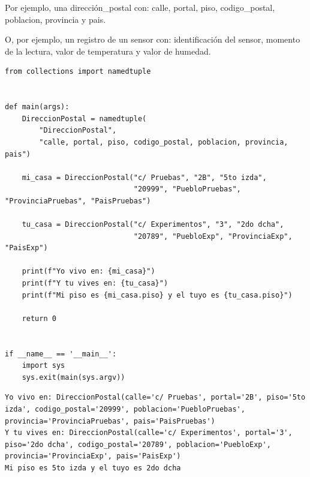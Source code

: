 \documentclass[spanish,12pt,a4paper,final,oneside]{book}
\begin{document}
Por ejemplo, una dirección\_postal con: calle, portal, piso, codigo\_postal, poblacion, provincia y pais.

O, por ejemplo, un registro de un sensor con: identificación del sensor, momento de la lectura, valor de temperatura y valor de humedad.

  

\begin{lstlisting}[frame=single, caption=lenguaje Python]
from collections import namedtuple


def main(args):
    DireccionPostal = namedtuple(
        "DireccionPostal",
        "calle, portal, piso, codigo_postal, poblacion, provincia, pais")

    mi_casa = DireccionPostal("c/ Pruebas", "2B", "5to izda",
                              "20999", "PuebloPruebas", "ProvinciaPruebas", "PaisPruebas")

    tu_casa = DireccionPostal("c/ Experimentos", "3", "2do dcha",
                              "20789", "PuebloExp", "ProvinciaExp", "PaisExp")

    print(f"Yo vivo en: {mi_casa}")
    print(f"Y tu vives en: {tu_casa}")
    print(f"Mi piso es {mi_casa.piso} y el tuyo es {tu_casa.piso}")

    return 0


if __name__ == '__main__':
    import sys
    sys.exit(main(sys.argv))
\end{lstlisting}

\begin{lstlisting}[frame=single]
Yo vivo en: DireccionPostal(calle='c/ Pruebas', portal='2B', piso='5to izda', codigo_postal='20999', poblacion='PuebloPruebas', provincia='ProvinciaPruebas', pais='PaisPruebas')
Y tu vives en: DireccionPostal(calle='c/ Experimentos', portal='3', piso='2do dcha', codigo_postal='20789', poblacion='PuebloExp', provincia='ProvinciaExp', pais='PaisExp')
Mi piso es 5to izda y el tuyo es 2do dcha
\end{lstlisting}
\end{document}
